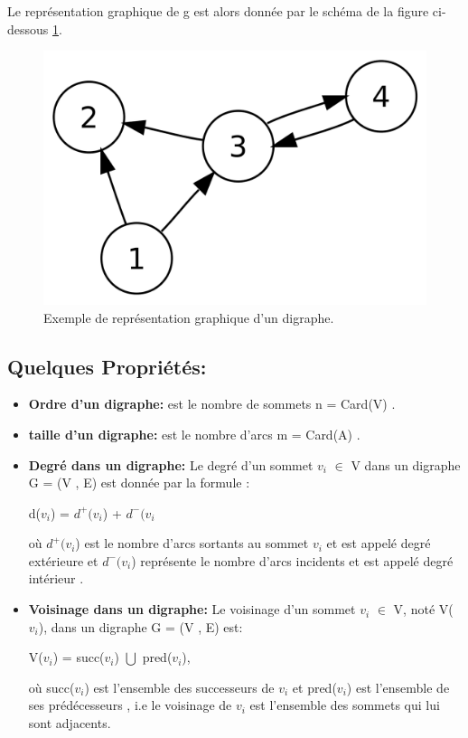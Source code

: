 		Le représentation graphique de g est alors donnée par le schéma de la figure  ci-dessous  \ref{grapheOr}.
	
		
			\begin{figure}[h]
			\includegraphics[scale=0.15,center]{./ressources/image/RepDiGraphe.png}
			\caption[Exemple de représentation graphique d'un digraphe.]{Exemple de représentation graphique d'un digraphe.}
			\label{grapheOr}
			\end{figure}
			
		
		\subsection{Quelques Propriétés:} %
			\begin{itemize}[label=$\circ$]
			\item\textbf{Ordre d'un digraphe:}
			est le nombre de sommets n = Card(V) \citep{DUT}.
			
			\item\textbf{taille d'un digraphe:} est le nombre d’arcs m = Card(A) \citep{DUT}.
			
			\item\textbf{Degré dans un digraphe:}
			Le degré d'un sommet $v_{i}$ $\in$ V dans un digraphe G = (V , E) est donnée par la formule :
			\begin{center}
				d($v_{i}$) = $d^+(v_{i}$) + $d^-(v_{i}$\\
			\end{center}			 
			 où $d^+(v_{i}$) est le nombre d'arcs sortants au sommet $v_{i}$ et est appelé degré extérieure et $d^-(v_{i}$) représente le nombre d'arcs incidents et est appelé degré intérieur \citep{muller}.
			 
			 \item\textbf{Voisinage dans un digraphe:}
			 Le voisinage d'un sommet $v_{i}$ $\in$ V, noté V($v_{i}$), dans un digraphe G = (V , E) est:
			 	\begin{center}
				V($v_{i}$) = succ($v_{i}$) $\bigcup$ pred($v_{i}$),
				\end{center}
				
				où succ($v_{i}$) est l'ensemble des successeurs de $v_{i}$ et pred($v_{i}$) est l'ensemble de ses prédécesseurs \citep{bac}, i.e le voisinage de $v_{i}$ est l'ensemble des sommets qui lui sont adjacents.
			
			\end{itemize}
			